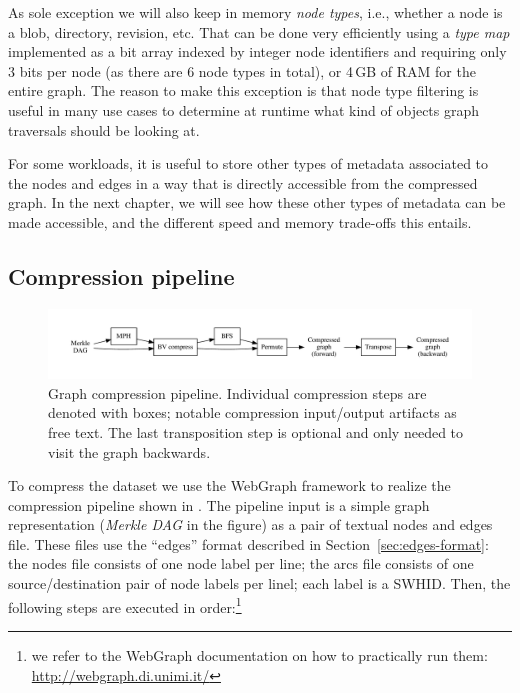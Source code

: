 As sole exception we will also keep in memory \emph{node types}, i.e., whether
a node is a blob, directory, revision, etc. That can be done very
efficiently using a \emph{type map} implemented as a bit array indexed by
integer node identifiers and requiring only 3 bits per node (as there are 6
node types in total), or 4\,GB of RAM for the entire graph. The reason to make
this exception is that node type filtering is useful in many use cases to
determine at runtime what kind of objects graph traversals should be looking
at.

For some workloads, it is useful to store other types of metadata associated to
the nodes and edges in a way that is directly accessible from the compressed
graph.
In the next chapter, we will see how these other types of metadata can be made
accessible, and the different speed and memory trade-offs this entails.

\subsection{Compression pipeline}%
\label{sec:compression-pipeline}

\begin{figure}
  \centering
  \includegraphics[width=\linewidth,trim=1cm 1cm 1cm 1cm]{img/compression/compression_steps-nofiles}
  \caption{Graph compression pipeline. Individual compression steps are denoted
    with boxes; notable compression input/output artifacts as free text. The
    last transposition step is optional and only needed to visit the graph
    backwards.}%
  \label{fig:compression-pipeline}
\end{figure}

To compress the dataset we use the WebGraph framework to realize the
compression pipeline shown in . The
pipeline input is a simple graph representation (\emph{Merkle DAG} in the
figure) as a pair of textual nodes and edges file. These files use the
``edges'' format described in Section~\ref{sec:edges-format}: the nodes file
consists of one node label per line; the arcs file consists of one
source/destination pair of node labels per linel; each label is a \gls{SWHID}.
Then, the following steps are executed in order:\footnote{we refer to the
WebGraph documentation on how to practically run them:
\url{http://webgraph.di.unimi.it/}}

